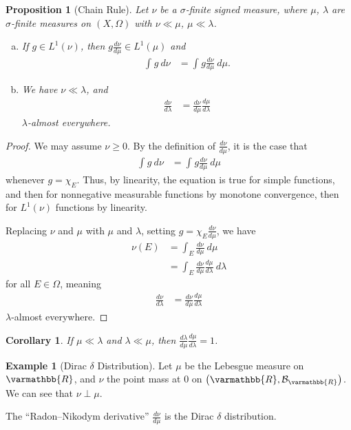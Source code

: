 \documentclass[10pt]{extarticle}
\newcommand{\R}{\mathbb{R}}
\theoremstyle{plain}
\newtheorem*{corollary}{Corollary}
\newtheorem*{proposition}{Proposition}
\theoremstyle{definition}
\newtheorem*{example}{Example}
\theoremstyle{note}
\renewcommand*{\mathbb}[1]{\varmathbb{#1}}
\renewcommand{\newline}{\hfill\break}
\begin{document}
\begin{proposition}[Chain Rule]
  Let $\nu$ be a $\sigma$-finite signed measure, where $\mu$, $\lambda$ are $\sigma$-finite measures on $(X,\Omega)$ with $\nu \ll \mu$, $\mu \ll \lambda$.
  \begin{enumerate}[(a)]
    \item If $g \in L^{1}\left(\nu\right)$, then $g\frac{d\nu}{d\mu}\in L^1\left(\mu\right)$ and
      \begin{align*}
        \int_{}^{} g\:d\nu &= \int_{}^{} g\frac{d\nu}{d\mu}\:d\mu.
      \end{align*}
    \item We have $\nu \ll \lambda$, and
      \begin{align*}
        \frac{d\nu}{d\lambda} &= \frac{d\nu}{d\mu}\frac{d\mu}{d\lambda}
      \end{align*}
      $\lambda$-almost everywhere.
  \end{enumerate}
\end{proposition}
\begin{proof}
  We may assume $\nu \geq 0$. By the definition of $\frac{d\nu}{d\mu}$, it is the case that
  \begin{align*}
    \int_{}^{} g\:d\nu &= \int_{}^{} g\frac{d\nu}{d\mu}\:d\mu
  \end{align*}
  whenever $g = \chi_E$. Thus, by linearity, the equation is true for simple functions, and then for nonnegative measurable functions by monotone convergence, then for $L^{1}(\nu)$ functions by linearity.\newline

  Replacing $\nu$ and $\mu$ with $\mu$ and $\lambda$, setting $g = \chi_E \frac{d\nu}{d\mu}$, we have
  \begin{align*}
    \nu(E) &= \int_{E}^{} \frac{d\nu}{d\mu}\:d\mu\\
           &= \int_{E}^{} \frac{d\nu}{d\mu}\frac{d\mu}{d\lambda}\:d\lambda
  \end{align*}
  for all $E\in \Omega$, meaning
  \begin{align*}
    \frac{d\nu}{d\lambda} &= \frac{d\nu}{d\mu}\frac{d\mu}{d\lambda}
  \end{align*}
  $\lambda$-almost everywhere.
\end{proof}
\begin{corollary}
  If $\mu \ll \lambda$ and $\lambda \ll \mu$, then $\frac{d\lambda}{d\mu}\frac{d\mu}{d\lambda} = 1$.
\end{corollary}
\begin{example}[Dirac $\delta$ Distribution]
  Let $\mu$ be the Lebesgue measure on $\R$, and $\nu$ the point mass at $0$ on $\left(\R,\mathcal{B}_{\R}\right)$. We can see that $\nu \perp \mu$.\newline

  The ``Radon--Nikodym derivative'' $\frac{d\nu}{d\mu}$ is the Dirac $\delta$ distribution.
\end{example}
\end{document}
